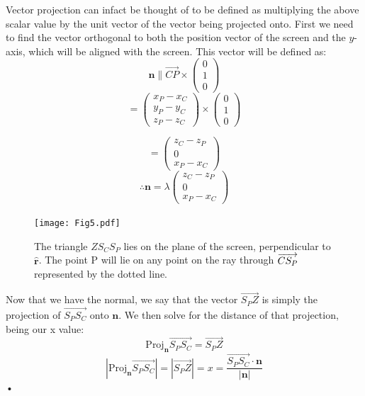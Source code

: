 \documentclass{article}
\newcommand\cpv{\overrightarrow{CP}\xspace}
\begin{document}
	Vector projection can infact be thought of to be defined as multiplying the above scalar value by the unit vector of the vector being projected onto.
	First we need to find the vector orthogonal to both the position vector of the screen and the $y$-axis, which will be aligned with the screen.
	This vector will be defined as: 
		$$ \mathbf{n} \parallel \cpv \times \begin{pmatrix}0\\1\\0\end{pmatrix} $$
		$$= \begin{pmatrix}x_P - x_C\\y_P - y_C\\z_P - z_C \end{pmatrix} \times \begin{pmatrix}0\\1\\0\end{pmatrix} $$
		
		$$= \begin{pmatrix}z_C - z_P\\ 0 \\x_P - x_C \end{pmatrix} $$
		\begin{equation}
			\therefore \mathbf{n} = \lambda \begin{pmatrix}z_C - z_P\\ 0 \\x_P - x_C \end{pmatrix}
		\end{equation}
	\paragraph{}
	
	\begin{figure}
		\centering
		\texttt{[image: Fig5.pdf]}
		\caption{The triangle $Z S_C S_P$ lies on the plane of the screen, perpendicular to $\hat{\mathbf{r}}$. The point P will lie on any point on the ray through $\protect\overrightarrow{C S_P}$ represented by the dotted line.}
	\end{figure}	


	Now that we have the normal, we say that the vector $\overrightarrow{S_P Z}$ is simply the projection of $\overrightarrow{S_P S_C}$ 
	onto $\mathbf{n}$. We then solve for the distance of that projection, being our x value:
	$$\text{Proj}_{\mathbf{n}} {\overrightarrow{S_P S_C}} = \overrightarrow{S_P Z}$$
	\begin{equation}
	\left| \text{Proj}_{\mathbf{n}} {\overrightarrow{S_P S_C}} \right| = \left|\overrightarrow{S_P Z}\right| = x = \frac{
		\overrightarrow{S_P S_C} \cdot \mathbf{n}}{
		\left|\mathbf{n}\right|}
	\end{equation}•
	
\end{document}
